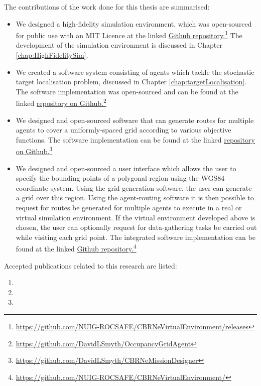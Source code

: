 The contributions of the work done for this thesis are summarised:
\begin{itemize}
    \item We designed a high-fidelity simulation environment, which was open-sourced for public use with an MIT Licence at the linked \href{https://github.com/NUIG-ROCSAFE/CBRNeVirtualEnvironment/releases}{Github repository.}\footnote{\href {https://github.com/NUIG-ROCSAFE/CBRNeVirtualEnvironment/releases}{https://github.com/NUIG-ROCSAFE/CBRNeVirtualEnvironment/releases}} The development of the simulation environment is discussed in Chapter \ref{chap:HighFidelitySim}.
    \item We created a software system consisting of agents which tackle the stochastic target localisation problem, discussed in Chapter \ref{chap:targetLocalisation}. The software implementation was open-sourced and can be found at the linked 
    \href{https://github.com/DavidLSmyth/OccupancyGridAgent}{repository on Github.}\footnote{\href {https://github.com/DavidLSmyth/OccupancyGridAgent}{https://github.com/DavidLSmyth/OccupancyGridAgent}} 
    \item We designed and open-sourced software that can generate routes for multiple agents to cover a uniformly-spaced grid according to various objective functions. The software implementation can be found at the linked 
    \href{https://github.com/DavidLSmyth/CBRNeMissionDesigner}{repository on Github.}\footnote{\href {https://github.com/DavidLSmyth/CBRNeMissionDesigner}{https://github.com/DavidLSmyth/CBRNeMissionDesigner}}
    \item We designed and open-sourced a user interface which allows the user to specify the bounding points of a polygonal region using the WGS84 coordinate system. Using the grid generation  software, the user can generate a grid over this region. Using the agent-routing software it is then possible to request for routes be generated for multiple agents to execute in a real or virtual simulation environment. If the virtual environment developed above is chosen, the user can optionally request for data-gathering tasks be carried out while visiting each grid point. The integrated software implementation can be found at the linked \href{https://github.com/NUIG-ROCSAFE/CBRNeVirtualEnvironment/}{Github repository.}\footnote{\href {https://github.com/NUIG-ROCSAFE/CBRNeVirtualEnvironment/}{https://github.com/NUIG-ROCSAFE/CBRNeVirtualEnvironment/}}
\end{itemize}

Accepted publications related to this research are listed:
\begin{enumerate}
    \item {}
    \item {}
    \item {}

\end{enumerate}